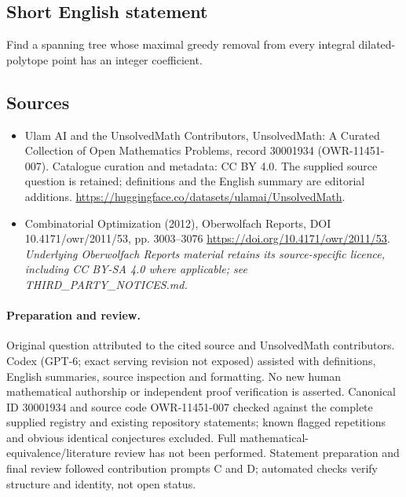 \documentclass[11pt]{article}
\begin{document}
\subsection{Short English statement}
Find a spanning tree whose maximal greedy removal from every integral dilated-polytope point has an integer coefficient.
\subsection{Sources}
\begin{itemize}
\item[\hypertarget{source:30001934:1}{S1}] Ulam AI and the UnsolvedMath Contributors, UnsolvedMath: A Curated Collection of Open Mathematics Problems, record 30001934 (OWR-11451-007). Catalogue curation and metadata: CC BY 4.0. The supplied source question is retained; definitions and the English summary are editorial additions.
\url{https://huggingface.co/datasets/ulamai/UnsolvedMath}.
\item[\hypertarget{source:30001934:2}{S2}] Combinatorial Optimization (2012), Oberwolfach Reports, DOI 10.4171/owr/2011/53, pp. 3003--3076
\url{https://doi.org/10.4171/owr/2011/53}.
\textit{Underlying Oberwolfach Reports material retains its source-specific licence, including CC BY-SA 4.0 where applicable; see THIRD\_PARTY\_NOTICES.md.}
\end{itemize}
\paragraph{Preparation and review.}
Original question attributed to the cited source and UnsolvedMath contributors. Codex (GPT-6; exact serving revision not exposed) assisted with definitions, English summaries, source inspection and formatting. No new human mathematical authorship or independent proof verification is asserted. Canonical ID 30001934 and source code OWR-11451-007 checked against the complete supplied registry and existing repository statements; known flagged repetitions and obvious identical conjectures excluded. Full mathematical-equivalence/literature review has not been performed. Statement preparation and final review followed contribution prompts C and D; automated checks verify structure and identity, not open status.
\label{end:30001934}
\end{document}
